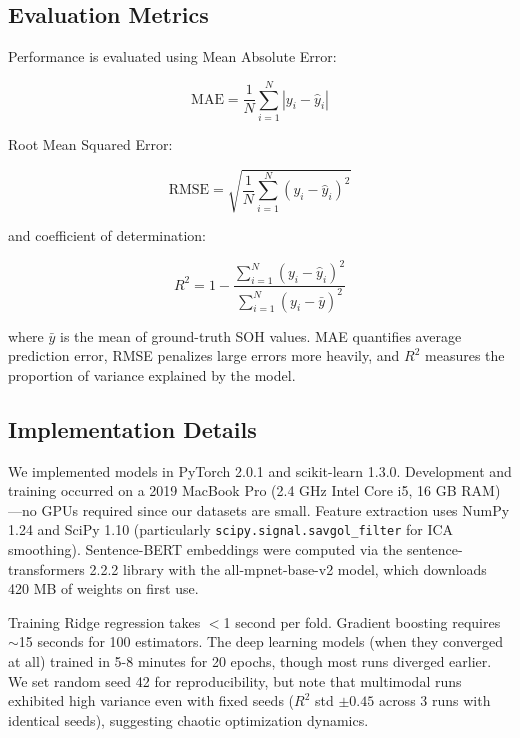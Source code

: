 \documentclass{sn-jnl}
\begin{document}
\subsection{Evaluation Metrics}
\label{subsec:metrics}

Performance is evaluated using Mean Absolute Error:

\begin{equation}
\label{eq:mae}
    \text{MAE} = \frac{1}{N}\sum_{i=1}^{N}|y_i - \hat{y}_i|
\end{equation}

Root Mean Squared Error:

\begin{equation}
\label{eq:rmse}
    \text{RMSE} = \sqrt{\frac{1}{N}\sum_{i=1}^{N}(y_i - \hat{y}_i)^2}
\end{equation}

and coefficient of determination:

\begin{equation}
\label{eq:r2}
    R^2 = 1 - \frac{\sum_{i=1}^{N}(y_i - \hat{y}_i)^2}{\sum_{i=1}^{N}(y_i - \bar{y})^2}
\end{equation}

where $\bar{y}$ is the mean of ground-truth SOH values. MAE quantifies average prediction error, RMSE penalizes large errors more heavily, and $R^2$ measures the proportion of variance explained by the model.

\subsection{Implementation Details}
\label{subsec:implementation}

We implemented models in PyTorch 2.0.1 and scikit-learn 1.3.0. Development and training occurred on a 2019 MacBook Pro (2.4 GHz Intel Core i5, 16 GB RAM)—no GPUs required since our datasets are small. Feature extraction uses NumPy 1.24 and SciPy 1.10 (particularly \texttt{scipy.signal.savgol\_filter} for ICA smoothing). Sentence-BERT embeddings were computed via the sentence-transformers 2.2.2 library with the all-mpnet-base-v2 model, which downloads 420 MB of weights on first use.

Training Ridge regression takes $<$1 second per fold. Gradient boosting requires $\sim$15 seconds for 100 estimators. The deep learning models (when they converged at all) trained in 5-8 minutes for 20 epochs, though most runs diverged earlier. We set random seed 42 for reproducibility, but note that multimodal runs exhibited high variance even with fixed seeds ($R^2$ std $\pm 0.45$ across 3 runs with identical seeds), suggesting chaotic optimization dynamics.
\end{document}
